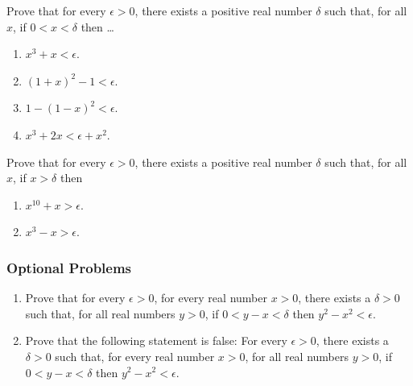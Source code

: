 \begin{exercise}
	Prove that for every $\epsilon > 0$, there exists a positive real number $\delta$ such that, for all $x$, if $ 0 < x < \delta$ then \dots
		\begin{enumerate}
			\item  $x ^ 3 + x < \epsilon$.
			\item  $(1 + x)^2 - 1 < \epsilon$.
			\item $1 - (1 - x)^2 < \epsilon$.
			\item  $x ^ 3 + 2x < \epsilon + x^2$.
		\end{enumerate}
		\noindent Prove that for every $\epsilon > 0$, there exists a positive real number $\delta$ such that, for all $x$, if $ x > \delta$ then
		\begin{enumerate}
			\item $x^{10} + x > \epsilon $.
			\item $x^3 - x > \epsilon$.
		\end{enumerate}
\end{exercise}

\subsubsection*{Optional Problems}
\begin{exercise}
	\begin{enumerate}
		\item Prove that for every $\epsilon > 0$, for every real number $x > 0$, there exists a $\delta > 0$ such that, for all real numbers $y > 0$, if $ 0 < y - x < \delta$ then $y^2 - x^2 < \epsilon$.
		\item Prove that the following statement is false: For every $\epsilon > 0$, there exists a $\delta > 0$ such that, for every real number $x > 0$, for all real numbers $y > 0$, if $ 0 < y - x < \delta$ then $y^2 - x^2 < \epsilon$.
	\end{enumerate}
\end{exercise}
